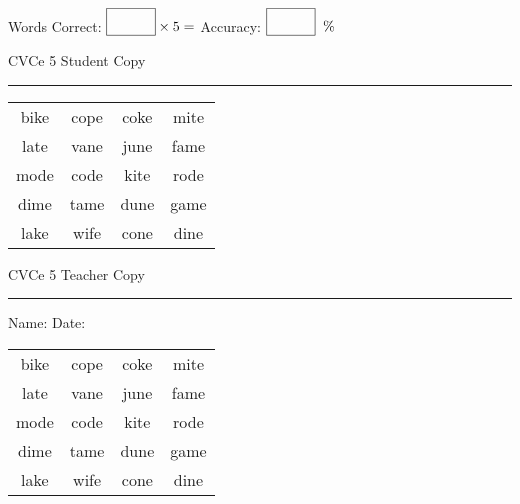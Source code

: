 \documentclass{memoir}
\begin{document}
\small

Words Correct: $\fbox{\phantom{\huge 100}} \times 5 = $ Accuracy: $\fbox{\phantom{\huge 100}}\;\; \%$ 

\vfill

\newpage


\footnotesize \noindent
CVCe 5 \hfill Student Copy
\smallskip
\hrule

\Large

\setlength{\tabcolsep}{14pt}
\def\arraystretch{2}

{\selectfont


\begin{vplace}[0.5]
\begin{center}
\begin{tabular}{cccc}
bike & cope & coke & mite \\
late & vane & june & fame \\
mode & code & kite & rode \\
dime & tame & dune & game \\
lake & wife & cone & dine \\
\end{tabular}
\end{center}
\end{vplace}

}

\newpage

\footnotesize \noindent
CVCe 5 \hfill Teacher Copy
\smallskip
\hrule

\small

\vfill

\noindent
Name: \underline{\hspace{1.75in}} \hfill Date: \underline{\hspace{1in}}

\Large

{\selectfont


\begin{vplace}[0.5]
\begin{center}
\begin{tabular}{cccc}
bike & cope & coke & mite \\
late & vane & june & fame \\
mode & code & kite & rode \\
dime & tame & dune & game \\
lake & wife & cone & dine \\
\end{tabular}
\end{center}
\end{vplace}



}
\end{document}
